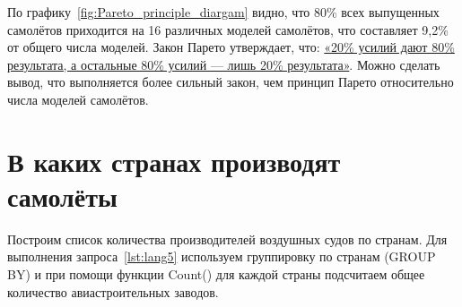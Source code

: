 По графику~\ref{fig:Pareto_principle_diargam} видно, что 80\% всех выпущенных самолётов приходится на 16 различных моделей самолётов, что составляет 9,2\% от общего числа моделей. Закон Парето утверждает, что: \href{https://w.wiki/vDs}{«20\% усилий дают 80\% результата, а остальные 80\% усилий — лишь 20\% результата»}. Можно сделать вывод, что выполняется более сильный закон, чем принцип Парето относительно числа моделей самолётов.

\section{В каких странах производят самолёты}

\label{aircraft_question_3}

Построим список количества производителей воздушных судов по странам. Для выполнения запроса~\ref{lst:lang5} используем группировку по странам (GROUP BY) и при помощи функции Count() для каждой страны подсчитаем общее количество авиастроительных заводов.


